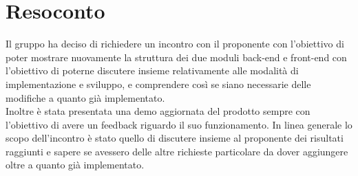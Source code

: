 \section{Resoconto}
Il gruppo ha deciso di richiedere un incontro con il proponente con l'obiettivo di poter mostrare nuovamente la struttura dei due moduli back-end e front-end con l'obiettivo di poterne discutere insieme relativamente alle modalità di implementazione e sviluppo, e comprendere così se siano necessarie delle modifiche a quanto già implementato. \\
Inoltre è stata presentata una demo aggiornata del prodotto sempre con l'obiettivo di avere un feedback riguardo il suo funzionamento.
In linea generale lo scopo dell'incontro è stato quello di discutere insieme al proponente dei risultati raggiunti e sapere se avessero delle altre richieste particolare da dover aggiungere oltre a quanto già implementato.